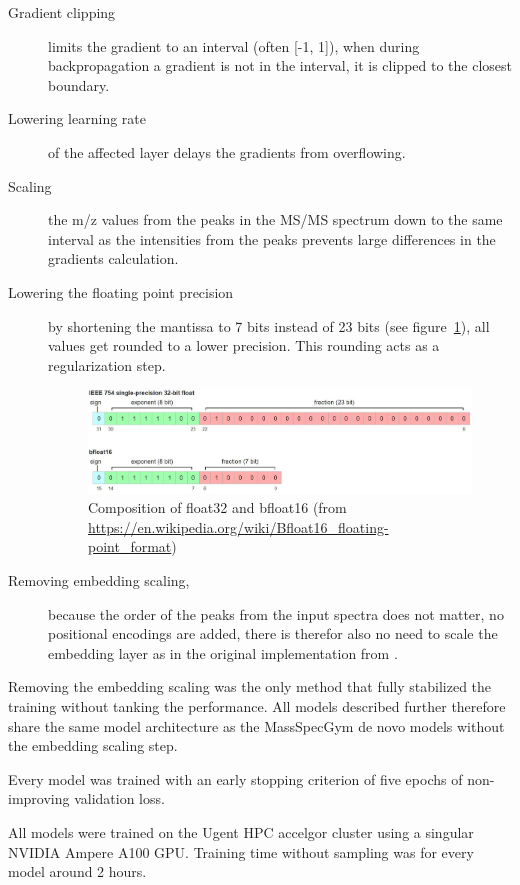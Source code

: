 \begin{description}
    \item[Gradient clipping]limits the gradient to an interval (often [-1, 1]),
    when during backpropagation a gradient is not in the interval,
    it is clipped to the closest boundary.
    \item[Lowering learning rate]of the affected layer delays the gradients from overflowing.
    \item[Scaling] the m/z values from the peaks in the \ac{MS/MS} spectrum down to the same interval as the intensities from the peaks prevents large differences in the gradients calculation.
    \item[Lowering the floating point precision]by shortening the mantissa to 7 bits instead of 23 bits (see figure~\ref{fig:bf16}), 
    all values get rounded to a lower precision. This rounding acts as a regularization step.
    \begin{figure}[h]
        \centering
        \includegraphics[width=\linewidth]{figures/methods/bf16.JPG}
        \caption{Composition of float32 and bfloat16 (from \url{https://en.wikipedia.org/wiki/Bfloat16_floating-point_format})}
        \label{fig:bf16}
    \end{figure}
    \item[Removing embedding scaling,]because the order of the peaks from the input spectra does not matter,
    no positional encodings are added, there is therefor also no need to scale the embedding layer as in the original implementation from \textcite{vaswani2017attention}.
\end{description}

Removing the embedding scaling was the only method that fully stabilized the training without tanking the performance.
All models described further therefore share the same model architecture as the MassSpecGym de novo models without the embedding scaling step.

Every model was trained with an early stopping criterion of five epochs of non-improving validation loss.

All models were trained on the Ugent \ac{HPC} accelgor cluster using a singular NVIDIA Ampere A100 GPU.
Training time without sampling was for every model around 2 hours. 

